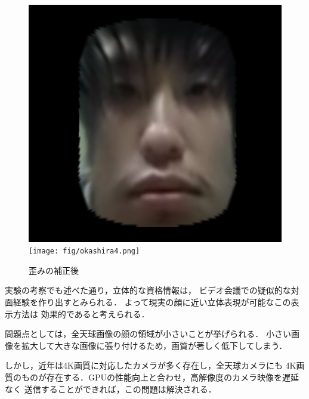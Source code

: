 \begin{figure}[tp]
  \centering
  \includegraphics[scale=0.6]{fig/okashira2.png}
  \texttt{[image: fig/okashira4.png]}
  \caption{歪みの補正後}
\end{figure}

実験の考察でも述べた通り，立体的な資格情報は，
ビデオ会議での疑似的な対面経験を作り出すとみられる．
よって現実の顔に近い立体表現が可能なこの表示方法は
効果的であると考えられる．

問題点としては，全天球画像の顔の領域が小さいことが挙げられる．
小さい画像を拡大して大きな画像に張り付けるため，画質が著しく低下してしまう．

しかし，近年は4K画質に対応したカメラが多く存在し，全天球カメラにも
4K画質のものが存在する．GPUの性能向上と合わせ，高解像度のカメラ映像を遅延なく
送信することができれば，この問題は解決される．